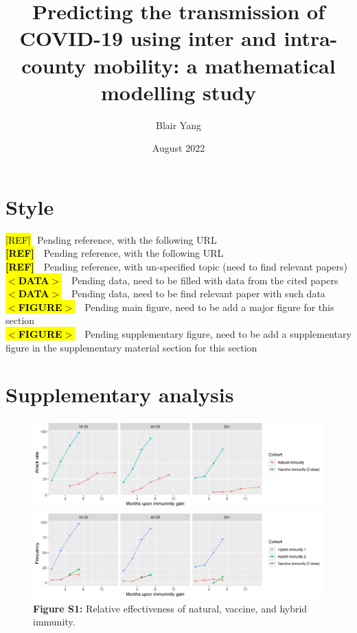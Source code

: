 \documentclass[12pt]{article}
\title{Predicting the transmission of COVID-19 using inter and intra-county mobility: a mathematical modelling study}
\author{Blair Yang}
\date{August 2022}
\newcommand{\urlref}{\hl{[REF]}}
\newcommand{\pendingref}{\textbf{\hl{[REF]}}$ \ $}
\newcommand{\unknownref}{\textcolor{ReD}{\textbf{\hl{[REF]}}}$ \ $}
\newcommand{\pendingdata}{\textbf{\hl{$<$DATA$>$}}$ \ $}
\newcommand{\unknowndata}{\textcolor{ReD}{\textbf{\hl{$<$DATA$>$}}}$ \ $}
\newcommand{\suppfigure}{{\textbf{\hl{$<$FIGURE$>$}}}$ \ $}
\newcommand{\mainfigure}{\textcolor{ReD}{\textbf{\hl{$<$FIGURE$>$}}}$ \ $}
\begin{document}
\maketitle

\section*{Style}
\urlref $ \ \ \ $Pending reference, with the following URL\\
\pendingref $ \ \ $ Pending reference, with the following URL\\
\unknownref $ \ \ $ Pending reference, with un-specified topic (need to find relevant papers)\\
\pendingdata $ \ \ $ Pending data, need to be filled with data from the cited papers\\
\unknowndata $ \ \ $ Pending data, need to be find relevant paper with such data\\
\mainfigure $ \ \ $ Pending main figure, need to be add a major figure for this section\\
\suppfigure $ \ \ $ Pending supplementary figure, need to be add a supplementary figure in the supplementary material section for this section\\

\newpage

\section{Supplementary analysis}

\begin{figure}[h]
    \includegraphics*[width=\textwidth]{vaccine_unvaccinated.jpg}
    \includegraphics*[width=\textwidth]{vaccine_vaccined.jpg}
    \textbf{Figure S1:} Relative effectiveness of natural, vaccine, and hybrid immunity.
\end{figure}
\end{document}
